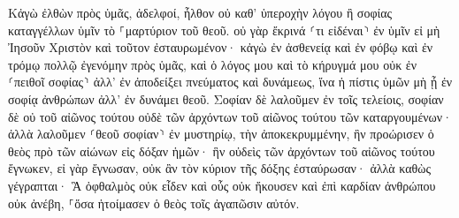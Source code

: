 \documentclass{openreader}
\begin{document}
Κἀγὼ ἐλθὼν πρὸς ὑμᾶς, ἀδελφοί, ἦλθον οὐ καθ’ ὑπεροχὴν λόγου ἢ σοφίας καταγγέλλων ὑμῖν τὸ ⸀μαρτύριον τοῦ θεοῦ. 
οὐ γὰρ ἔκρινά ⸂τι εἰδέναι⸃ ἐν ὑμῖν εἰ μὴ Ἰησοῦν Χριστὸν καὶ τοῦτον ἐσταυρωμένον· 
κἀγὼ ἐν ἀσθενείᾳ καὶ ἐν φόβῳ καὶ ἐν τρόμῳ πολλῷ ἐγενόμην πρὸς ὑμᾶς, 
καὶ ὁ λόγος μου καὶ τὸ κήρυγμά μου οὐκ ἐν ⸂πειθοῖ σοφίας⸃ ἀλλ’ ἐν ἀποδείξει πνεύματος καὶ δυνάμεως, 
ἵνα ἡ πίστις ὑμῶν μὴ ᾖ ἐν σοφίᾳ ἀνθρώπων ἀλλ’ ἐν δυνάμει θεοῦ. 
Σοφίαν δὲ λαλοῦμεν ἐν τοῖς τελείοις, σοφίαν δὲ οὐ τοῦ αἰῶνος τούτου οὐδὲ τῶν ἀρχόντων τοῦ αἰῶνος τούτου τῶν καταργουμένων· 
ἀλλὰ λαλοῦμεν ⸂θεοῦ σοφίαν⸃ ἐν μυστηρίῳ, τὴν ἀποκεκρυμμένην, ἣν προώρισεν ὁ θεὸς πρὸ τῶν αἰώνων εἰς δόξαν ἡμῶν· 
ἣν οὐδεὶς τῶν ἀρχόντων τοῦ αἰῶνος τούτου ἔγνωκεν, εἰ γὰρ ἔγνωσαν, οὐκ ἂν τὸν κύριον τῆς δόξης ἐσταύρωσαν· 
ἀλλὰ καθὼς γέγραπται· Ἃ ὀφθαλμὸς οὐκ εἶδεν καὶ οὖς οὐκ ἤκουσεν καὶ ἐπὶ καρδίαν ἀνθρώπου οὐκ ἀνέβη, ⸀ὅσα ἡτοίμασεν ὁ θεὸς τοῖς ἀγαπῶσιν αὐτόν. 
\end{document}
